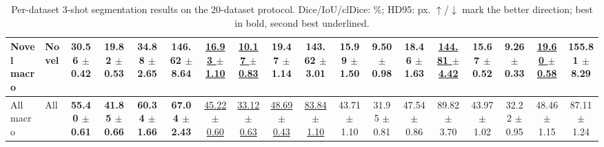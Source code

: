 \begin{table}[t]
{\begin{tabular}{llcccc|cccc|cccc|cccc}
\midrule
Novel macro & Novel & \textbf{30.56 $\pm$ 0.42} & \textbf{19.82 $\pm$ 0.53} & \textbf{34.88 $\pm$ 2.65} & 146.62 $\pm$ 8.64 & \underline{16.93 $\pm$ 1.10} & \underline{10.17 $\pm$ 0.83} & 19.47 $\pm$ 1.14 & \textbf{143.62 $\pm$ 3.01} & 15.99 $\pm$ 1.50 & 9.50 $\pm$ 0.98 & 18.46 $\pm$ 1.63 & \underline{144.81 $\pm$ 4.42} & 15.67 $\pm$ 0.52 & 9.26 $\pm$ 0.33 & \underline{19.60 $\pm$ 0.58} & 155.81 $\pm$ 8.29 \\
\midrule
All macro & All & \textbf{55.40 $\pm$ 0.61} & \textbf{41.85 $\pm$ 0.66} & \textbf{60.34 $\pm$ 1.66} & \textbf{67.04 $\pm$ 2.43} & \underline{45.22 $\pm$ 0.60} & \underline{33.12 $\pm$ 0.63} & \underline{48.69 $\pm$ 0.43} & \underline{83.84 $\pm$ 1.10} & 43.71 $\pm$ 1.10 & 31.95 $\pm$ 0.81 & 47.54 $\pm$ 0.86 & 89.82 $\pm$ 3.70 & 43.97 $\pm$ 1.02 & 32.22 $\pm$ 0.95 & 48.46 $\pm$ 1.15 & 87.11 $\pm$ 1.24 \\
\bottomrule
\end{tabular}}
\caption{Per-dataset 3-shot segmentation results on the 20-dataset protocol.  Dice/IoU/clDice: \%; HD95: px. $\uparrow$/$\downarrow$ mark the better direction; best in bold, second best underlined.}
\label{tab:per-dataset}
\end{table}
